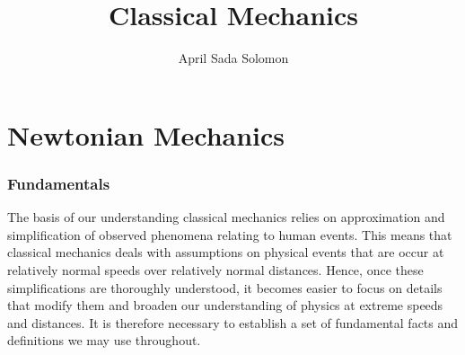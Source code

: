 \documentclass{article}
\title{Classical Mechanics}
\author{April Sada Solomon}
\begin{document}
	
	\clearpage
	\maketitle
	\newpage
	
	\tableofcontents
	\newpage
	
	\setcounter{page}{1}
	\cfoot{\thepage}

	
	\part{Newtonian Mechanics}
		\section{Fundamentals}
		The basis of our understanding classical mechanics relies on approximation and simplification of observed phenomena relating to human events. This means that classical mechanics deals with assumptions on physical events that are occur at relatively normal speeds over relatively normal distances. Hence, once these simplifications are thoroughly understood, it becomes easier to focus on details that modify them and broaden our understanding of physics at extreme speeds and distances. It is therefore necessary to establish a set of fundamental facts and definitions we may use throughout.
		
\end{document}
